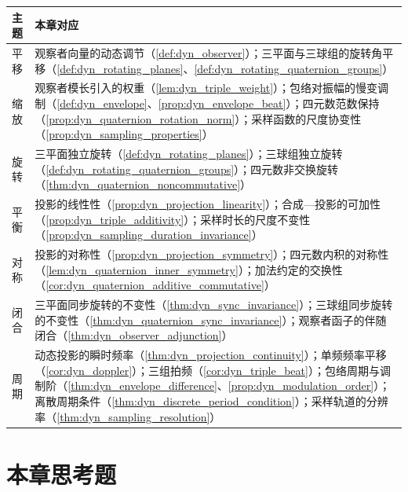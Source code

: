\begin{center}
\renewcommand{\arraystretch}{1.3}
\begin{tabular}{@{}p{2.2cm}p{10.5cm}@{}}
\toprule
主题 & 本章对应 \\
\midrule
平移 & 观察者向量的动态调节（\cref{def:dyn_observer}）；三平面与三球组的旋转角平移（\cref{def:dyn_rotating_planes}、\cref{def:dyn_rotating_quaternion_groups}） \\
缩放 & 观察者模长引入的权重（\cref{lem:dyn_triple_weight}）；包络对振幅的慢变调制（\cref{def:dyn_envelope}、\cref{prop:dyn_envelope_beat}）；四元数范数保持（\cref{prop:dyn_quaternion_rotation_norm}）；采样函数的尺度协变性（\cref{prop:dyn_sampling_properties}） \\
旋转 & 三平面独立旋转（\cref{def:dyn_rotating_planes}）；三球组独立旋转（\cref{def:dyn_rotating_quaternion_groups}）；四元数非交换旋转（\cref{thm:dyn_quaternion_noncommutative}） \\
平衡 & 投影的线性性（\cref{prop:dyn_projection_linearity}）；合成—投影的可加性（\cref{prop:dyn_triple_additivity}）；采样时长的尺度不变性（\cref{prop:dyn_sampling_duration_invariance}） \\
对称 & 投影的对称性（\cref{prop:dyn_projection_symmetry}）；四元数内积的对称性（\cref{lem:dyn_quaternion_inner_symmetry}）；加法约定的交换性（\cref{cor:dyn_quaternion_additive_commutative}） \\
闭合 & 三平面同步旋转的不变性（\cref{thm:dyn_sync_invariance}）；三球组同步旋转的不变性（\cref{thm:dyn_quaternion_sync_invariance}）；观察者函子的伴随闭合（\cref{thm:dyn_observer_adjunction}） \\
周期 & 动态投影的瞬时频率（\cref{thm:dyn_projection_continuity}）；单频频率平移（\cref{cor:dyn_doppler}）；三组拍频（\cref{cor:dyn_triple_beat}）；包络周期与调制阶（\cref{thm:dyn_envelope_difference}、\cref{prop:dyn_modulation_order}）；离散周期条件（\cref{thm:dyn_discrete_period_condition}）；采样轨道的分辨率（\cref{thm:dyn_sampling_resolution}） \\
\bottomrule
\end{tabular}
\end{center}

\section*{本章思考题}

